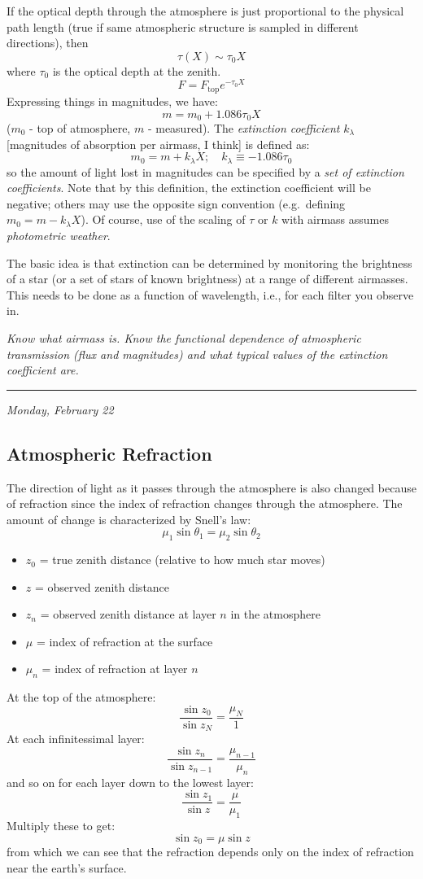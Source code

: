 \documentclass[12pt]{article}
\newcommand{\test}[1]{%
    \begin{center}
        {\parbox{0.9\textwidth}{\textit{\small#1}}}
    \end{center}}
\newcommand{\mydate}[1]{
    \begin{flushright}
        \rule{\textwidth}{0.4pt} %
        \footnotesize\hfill\textit{#1}
    \end{flushright}}
\begin{document}
If the optical depth through the atmosphere is just proportional to the
physical path length (true if same atmospheric structure is sampled in
different directions), then
\[
    \tau(X) \sim \tau_{0}X
    \]
where $\tau_{0}$ is the optical depth at the zenith.
\[
     F = F_{\textrm{top}}e^{-\tau_{0}X}
    \]
Expressing things in magnitudes, we have:
\[
     m = m_{0} + 1.086\tau_{0}X
    \]
($m_{0}$ - top of atmosphere, $m$ - measured).
The \textit{extinction coefficient} $k_{\lambda}$ [magnitudes of
absorption per airmass, I think] is defined as:
\[
     m_{0} = m + k_{\lambda}X ;\quad
     k_{\lambda} \equiv -1.086\tau_{0}
    \]
so the amount of light lost in magnitudes can be specified by a \emph{set of
extinction coefficients}. Note that by this definition, the extinction
coefficient will be negative; others may use the opposite sign convention
(e.g.\ defining $m_{0} = m - k_{\lambda}X$). Of course, use of the scaling of
$\tau$ or $k$ with airmass assumes \textit{photometric weather}.

The basic idea is that extinction can be determined by monitoring the
brightness of a star (or a set of stars of known brightness) at a range of
different airmasses. This needs to be done as a function of wavelength, i.e.,
for each filter you observe in.

\test{Know what airmass is. Know the functional dependence of atmospheric
transmission (flux and magnitudes) and what typical values of the extinction
coefficient are.}

\mydate{Monday, February 22}
\subsection{Atmospheric Refraction}
The direction of light as it passes through the atmosphere is also changed
because of refraction since the index of refraction changes through the
atmosphere. The amount of change is characterized by Snell's law:
\[
     \mu_{1}\sin\theta_{1} = \mu_{2}\sin\theta_{2}
     \]
\begin{itemize}
    \item $z_{0}$ = true zenith distance (relative to how much star moves)
    \item $z$ = observed zenith distance
    \item $z_{n}$ = observed zenith distance at layer $n$ in the
        atmosphere
    \item $\mu$ = index of refraction at the surface
    \item $\mu_{n}$ = index of refraction at layer $n$
\end{itemize}
At the top of the atmosphere:
\[
     \frac{\sin z_{0}}{\sin z_{N}} = \frac{\mu_{N}}{1}
     \]
At each infinitessimal layer:
\[
     \frac{\sin z_{n}}{\sin z_{n-1}} = \frac{\mu_{n-1}}{\mu_{n}}
     \]
and so on for each layer down to the lowest layer:
\[
     \frac{\sin z_{1}}{\sin z} = \frac{\mu}{\mu_{1}}
     \]
Multiply these to get:
\[
     \sin z_{0} = \mu\sin z
     \]
from which we can see that the refraction depends
only on the index of refraction near the earth's surface.
\end{document}
